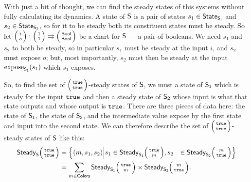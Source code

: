 \documentclass[DynamicalBook]{subfiles}
\begin{document}
With just a bit of thought, we can find the steady states of this systems without fully calculating its
dynamics. A state of $\mathsf{S}$ is a pair of states $s_1 \in  \mathsf{State}_{\mathsf{S_1}}$ and
$s_2 \in \mathsf{State}_{\mathsf{S_2}}$, so for it to be steady both its constituent states must be steady.
So let $\lens{i}{o} : \lens{\ord{1}}{\ord{1}} \tto
\lens{\Set{Bool}}{\Set{Bool}}$ be a chart for $\mathsf{S}$ --- a pair of booleans.
We need $s_1$ and $s_2$ to both be steady, so in particular $s_1$ must be steady
at the input $i$, and $s_2$ must expose $o$; but, most importantly, $s_2$ must then be steady at the input
$\mathrm{expose}_{\mathsf{S_1}}(s_1)$ which $s_1$ exposes.

So, to find the set of
$\lens{\true}{\true}$-steady states of $\mathsf{S}$, we must a state of
$\mathsf{S_1}$ which is steady for the input $\mathtt{true}$ and then a steady state of
$\mathsf{S_2}$ whose input is what that state outputs and whose output is $\mathtt{true}$.
There are three pieces of data here: the state of $\mathsf{S_1}$, the state of
$\mathsf{S_2}$, and the intermediate value expose by the first state and input into
the second state. We can therefore describe the set of $\lens{\true}{\true}$-steady states of
$\mathsf{S}$ like this:
\begin{align*}
  \Set{Steady}_{\Sys{S}}\lens{\true}{\true} &= \left\{ (m, s_1, s_2)
  \middle| \begin{aligned}
    s_1 &\in \Set{Steady}_{\Sys{S_1}}\lens{\true}{m},
    s_2 &\in \Set{Steady}_{\Sys{S_2}}\lens{m}{\true}
  \end{aligned}\right\} \\
  &= \sum_{m \in \Set{Colors}} \Set{Steady}_{\Sys{S_1}} \lens{\true}{m} \times \Set{Steady}_{\Sys{S_2}}\lens{m}{\true}.
\end{align*}
\end{document}
